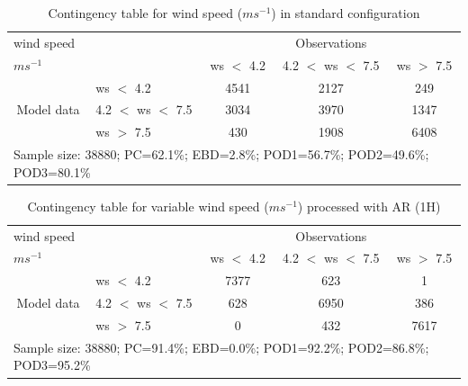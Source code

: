 \documentclass[a4paper,english]{article}
\begin{document}
\clearpage
\begin{table}[]
\begin{center}
\begin{tabular}{llccc}
\hline
{wind speed}                                       &                                                    & \multicolumn{3}{c}{Observations}                 \\
{$m s^{-1}$}                                       &                             & ws $<$ 4.2   & 4.2 $<$ ws $<$ 7.5 & ws $>$ 7.5 \\
\hline
\multicolumn{1}{c}{\multirow{3}{*}{Model data}}  & ws $<$ 4.2             & 4541                & 2127                       & 249              \\
                                                 & 4.2  $<$ ws $<$ 7.5 & 3034                & 3970                       & 1347              \\
                                                 & ws $>$ 7.5             & 430                & 1908                       & 6408              \\
\hline 
\multicolumn{5}{l}{Sample size: 38880; PC=62.1\%; EBD=2.8\%; POD1=56.7\%; POD2=49.6\%; POD3=80.1\%}                 \\
\end{tabular}
\end{center}
\caption{Contingency table for {wind speed} ($m s^{-1}$) in standard configuration}
\label{tab:contingencywsBEF}
\end{table}
\begin{table}[]
\begin{center}
\begin{tabular}{llccc}
\hline
{wind speed}                                       &                                                    & \multicolumn{3}{c}{Observations}                 \\
{$m s^{-1}$}                                       &                             & ws $<$ 4.2   & 4.2 $<$ ws $<$ 7.5 & ws $>$ 7.5 \\
\hline
\multicolumn{1}{c}{\multirow{3}{*}{Model data}}  & ws $<$ 4.2             & 7377                & 623                       & 1              \\
                                                 & 4.2  $<$ ws $<$ 7.5 & 628                & 6950                       & 386              \\
                                                 & ws $>$ 7.5             & 0                & 432                       & 7617              \\
\hline 
\multicolumn{5}{l}{Sample size: 38880; PC=91.4\%; EBD=0.0\%; POD1=92.2\%; POD2=86.8\%; POD3=95.2\%}                 \\
\end{tabular}
\end{center}
\caption{Contingency table for variable wind speed ($m s^{-1}$) processed with AR (1H)}
\label{tab:contingencywsAFT}
\end{table}
\end{document}
